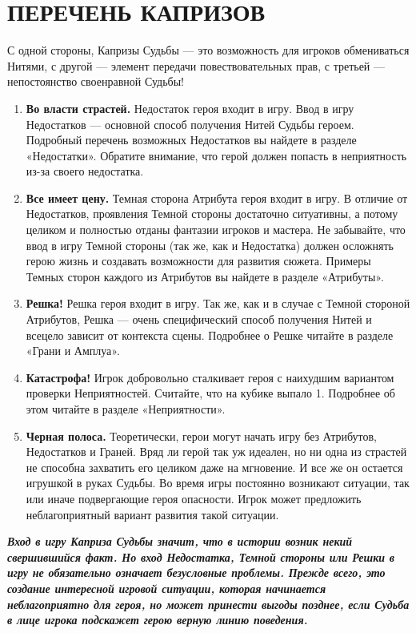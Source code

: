 \section{ПЕРЕЧЕНЬ КАПРИЗОВ}
С одной стороны, Капризы Судьбы — это возможность для игроков обмениваться Нитями, с другой — элемент передачи повествовательных прав, с третьей — непостоянство своенравной Судьбы!
\begin{enumerate}
\item \textbf{Во власти страстей.}
Недостаток героя входит в игру. Ввод в игру Недостатков — основной способ получения Нитей Судьбы героем. Подробный перечень возможных Недостатков вы найдете в разделе «Недостатки».
\newline
Обратите внимание, что герой должен попасть в неприятность из-за своего недостатка.
\item \textbf{Все имеет цену.}
Темная сторона Атрибута героя входит в игру. В отличие от Недостатков, проявления Темной стороны достаточно ситуативны, а потому целиком и полностью отданы фантазии игроков и мастера. Не забывайте, что ввод в игру Темной стороны (так же, как и Недостатка) должен осложнять герою жизнь и создавать возможности для развития сюжета. Примеры Темных сторон каждого из Атрибутов вы найдете в разделе «Атрибуты».
\item \textbf{Решка!}
Решка героя входит в игру. Так же, как и в случае с Темной стороной Атрибутов, Решка — очень специфический способ получения Нитей и всецело зависит от контекста сцены. Подробнее о Решке читайте в разделе «Грани и Амплуа».
\item \textbf{Катастрофа!}
Игрок добровольно сталкивает героя с наихудшим вариантом проверки Неприятностей. Считайте, что на кубике выпало 1. Подробнее об этом читайте в разделе «Неприятности».
\item \textbf{Черная полоса.}
Теоретически, герои могут начать игру без Атрибутов, Недостатков и Граней. Вряд ли герой так уж идеален, но ни одна из страстей не способна захватить его целиком даже на мгновение. И все же он остается игрушкой в руках Судьбы. Во время игры постоянно возникают ситуации, так или иначе подвергающие героя опасности. Игрок может предложить неблагоприятный вариант развития такой ситуации.
\end{enumerate}
\textbf{\textit{Вход в игру Каприза Судьбы значит, что в истории возник некий свершившийся факт. Но вход Недостатка, Темной стороны или Решки в игру не обязательно означает безусловные проблемы.
\newline Прежде всего, это создание интересной игровой ситуации, которая начинается неблагоприятно для героя, но может принести выгоды позднее, если Судьба в лице игрока подскажет герою верную линию поведения.}}
